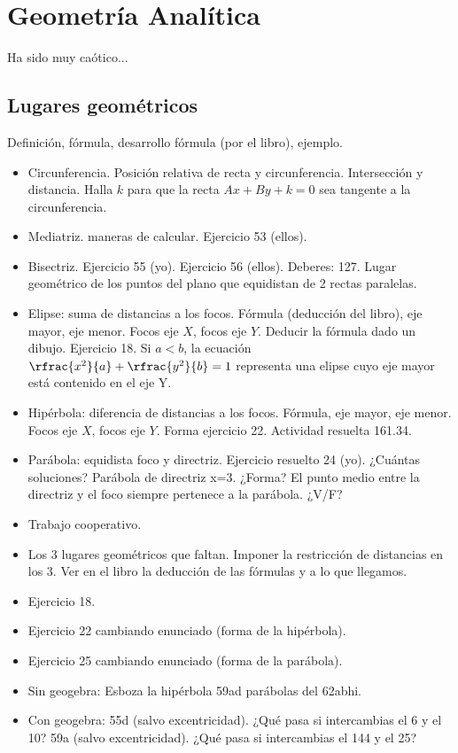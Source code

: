 \documentclass[palatino,nosec]{Docencia}
\begin{document}
\section{Geometría Analítica}

Ha sido muy caótico...


\subsection{Lugares geométricos}

Definición, fórmula, desarrollo fórmula (por el libro), ejemplo.

\begin{itemize}
	\item Circunferencia.
	\subitem Posición relativa de recta y circunferencia. Intersección y distancia.
	\subitem Halla $k$ para que la recta $Ax+By+k=0$ sea tangente a la circunferencia.
	\item Mediatriz.
	 maneras de calcular. Ejercicio 53 (ellos).
	\item Bisectriz. 
	\subitem Ejercicio 55 (yo).
	\subitem Ejercicio 56 (ellos).
	\subitem Deberes: 127.
	\subitem Lugar geométrico de los puntos del plano que equidistan de 2 rectas paralelas.
	\item Elipse: suma de distancias a los focos.
	\subitem Fórmula (deducción del libro), eje mayor, eje menor.
	\subitem Focos eje $X$, focos eje $Y$.
	\subitem Deducir la fórmula dado un dibujo.
	\subitem Ejercicio 18.
	\subitem Si $a<b$, la ecuación $\rfrac{x^2}{a} + \rfrac{y^2}{b} = 1$ representa una elipse cuyo eje mayor está contenido en el eje Y.
	\item Hipérbola: diferencia de distancias a los focos.
	\subitem Fórmula, eje mayor, eje menor.
	\subitem Focos eje $X$, focos eje $Y$.
	\subitem Forma ejercicio 22.
	\subitem Actividad resuelta 161.34.
	\item Parábola: equidista foco y directriz.
	\subitem Ejercicio resuelto 24 (yo). ¿Cuántas soluciones?
	\subitem Parábola de directriz x=3. ¿Forma?
	\subitem El punto medio entre la directriz y el foco siempre pertenece a la parábola. ¿V/F?
\end{itemize}


\begin{itemize}
	\item Trabajo cooperativo. 
	\item Los 3 lugares geométricos que faltan. Imponer la restricción de distancias en los 3. Ver en el libro la deducción de las fórmulas y a lo que llegamos.
	\item Ejercicio 18.
	\item Ejercicio 22 cambiando enunciado (forma de la hipérbola).
	\item Ejercicio 25 cambiando enunciado (forma de la parábola).
	\item Sin geogebra:
		\subitem Esboza la hipérbola 59ad parábolas del 62abhi.
	\item Con geogebra: 
		\subitem 55d (salvo excentricidad). ¿Qué pasa si intercambias el 6 y el 10? 
		\subitem 59a (salvo excentricidad). ¿Qué pasa si intercambias el 144 y el 25?

\end{itemize}
\end{document}

